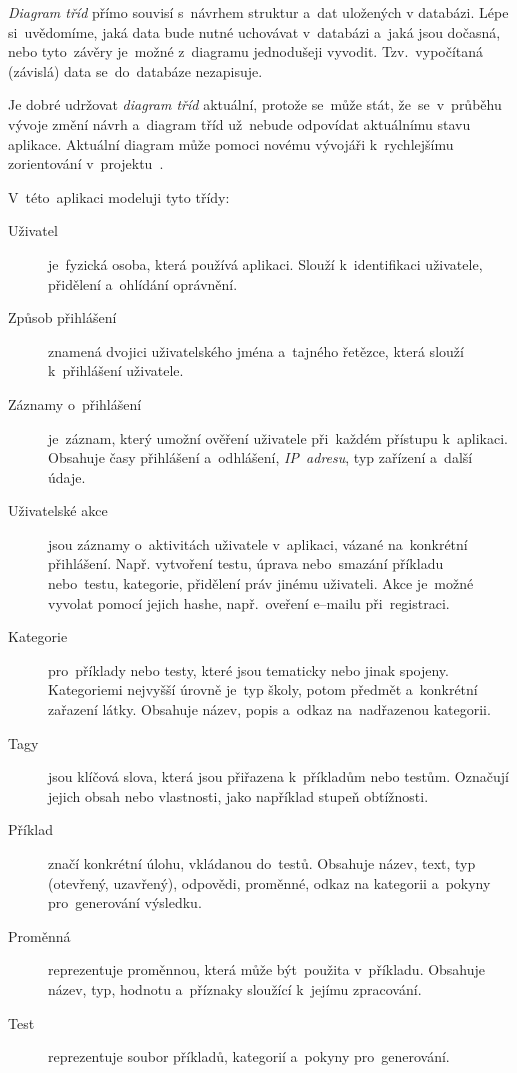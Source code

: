 \documentclass[11pt,a4paper]{report}
\begin{document}
                \emph{Diagram tříd} přímo souvisí s~návrhem struktur a~dat uložených v databázi. Lépe si~uvědomíme, jaká data bude nutné uchovávat v~databázi a~jaká jsou dočasná, nebo tyto~závěry je~možné z~diagramu jednodušeji vyvodit. Tzv.~vypočítaná (závislá) data se~do~databáze nezapisuje.

                Je dobré udržovat \emph{diagram tříd} aktuální, protože se~může stát, že~se~v~průběhu vývoje změní návrh a~diagram tříd už~nebude odpovídat aktuálnímu stavu aplikace. Aktuální diagram může pomoci novému vývojáři k~rychlejšímu zorientování v~projektu~\cite{visualparadigmClassDiagram}.

                
                V~této~aplikaci modeluji tyto třídy:

                \begin{description}
                    \item[Uživatel] je~fyzická osoba, která používá aplikaci. Slouží k~identifikaci uživatele, přidělení a~ohlídání oprávnění.
                    \item[Způsob přihlášení] znamená dvojici uživatelského jména a~tajného řetězce, která slouží k~přihlášení uživatele.
                    \item[Záznamy o~přihlášení] je~záznam, který umožní ověření uživatele při~každém přístupu k~aplikaci. Obsahuje časy přihlášení a~odhlášení, \emph{IP~adresu}, typ zařízení a~další údaje.
                    \item[Uživatelské akce] jsou záznamy o~aktivitách uživatele v~aplikaci, vázané na~konkrétní přihlášení. Např. vytvoření testu, úprava nebo~smazání příkladu nebo~testu, kategorie, přidělení práv jinému uživateli. Akce je~možné vyvolat pomocí jejich hashe, např.~oveření e--mailu při~registraci.
                    \item[Kategorie] pro~příklady nebo testy, které jsou tematicky nebo jinak spojeny. Kategoriemi nejvyšší úrovně je~typ školy, potom předmět a~konkrétní zařazení látky. Obsahuje název, popis a~odkaz na~nadřazenou kategorii.
                    \item[Tagy] jsou klíčová slova, která jsou přiřazena k~příkladům nebo testům. Označují jejich obsah nebo vlastnosti, jako například stupeň obtížnosti.
                    \item[Příklad] značí konkrétní úlohu, vkládanou do~testů. Obsahuje název, text, typ (otevřený, uzavřený), odpovědi, proměnné, odkaz na kategorii a~pokyny pro~generování výsledku.
                    \item[Proměnná] reprezentuje proměnnou, která může být~použita v~příkladu. Obsahuje název, typ, hodnotu a~příznaky sloužící k~jejímu zpracování.
                    \item[Test] reprezentuje soubor příkladů, kategorií a~pokyny pro~generování.
                \end{description}
\end{document}
